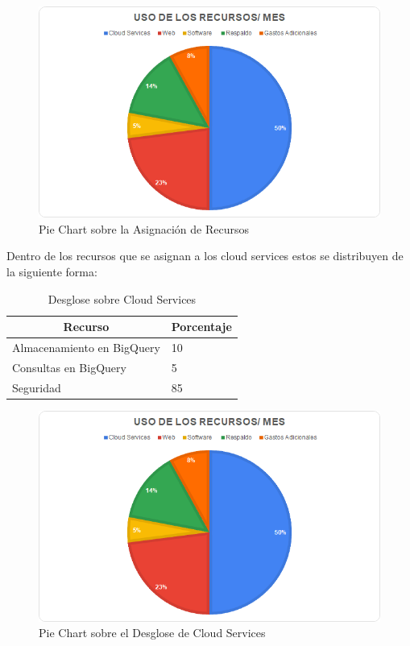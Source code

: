 \documentclass[12pt,a4paper,openright]{article}
\begin{document}
\begin{figure}[ht]
\includegraphics[width=15cm]{TC1.png}
\centering
\caption{Pie Chart sobre la Asignaci\'on de Recursos}
\end{figure}

Dentro de los recursos que se asignan a los cloud services estos se distribuyen de la siguiente forma:

\begin{table}[ht]
\centering
\begin{tabular}{|l|l|}
\hline
\multicolumn{1}{|c|}{\textbf{Recurso}} & \multicolumn{1}{c|}{\textbf{Porcentaje}} \\ \hline \hline
Almacenamiento en BigQuery             & 10                                       \\ \hline
Consultas en BigQuery                  & 5                                        \\ \hline
Seguridad                              & 85                                       \\ \hline
\end{tabular}
\caption{Desglose sobre Cloud Services}
\end{table}

\begin{figure}[ht]
\includegraphics[width=15cm]{TC1.png}
\centering
\caption{Pie Chart sobre el Desglose de Cloud Services}
\end{figure}
\end{document}
